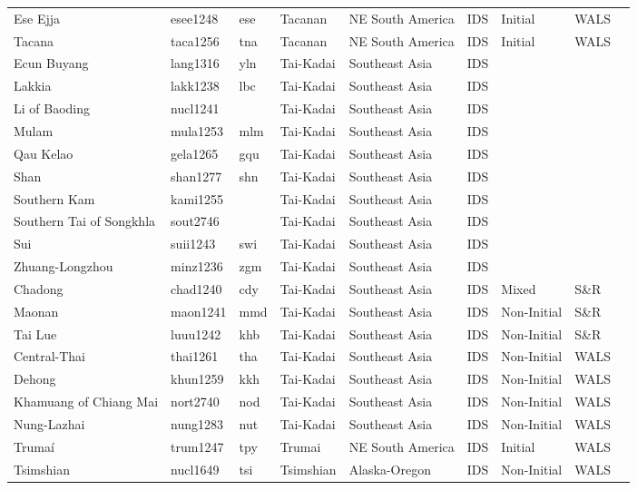 \begin{longtable}{lllllllll}
  Ese Ejja & esee1248 & ese & Tacanan & NE South America & IDS & Initial & WALS &  \\ 
  Tacana & taca1256 & tna & Tacanan & NE South America & IDS & Initial & WALS &  \\ 
  Ecun Buyang & lang1316 & yln & Tai-Kadai & Southeast Asia & IDS &  &  &  \\ 
  Lakkia & lakk1238 & lbc & Tai-Kadai & Southeast Asia & IDS &  &  &  \\ 
  Li of Baoding & nucl1241 &  & Tai-Kadai & Southeast Asia & IDS &  &  &  \\ 
  Mulam & mula1253 & mlm & Tai-Kadai & Southeast Asia & IDS &  &  &  \\ 
  Qau Kelao & gela1265 & gqu & Tai-Kadai & Southeast Asia & IDS &  &  &  \\ 
  Shan & shan1277 & shn & Tai-Kadai & Southeast Asia & IDS &  &  &  \\ 
  Southern Kam & kami1255 &  & Tai-Kadai & Southeast Asia & IDS &  &  &  \\ 
  Southern Tai of Songkhla & sout2746 &  & Tai-Kadai & Southeast Asia & IDS &  &  &  \\ 
  Sui & suii1243 & swi & Tai-Kadai & Southeast Asia & IDS &  &  &  \\ 
  Zhuang-Longzhou & minz1236 & zgm & Tai-Kadai & Southeast Asia & IDS &  &  &  \\ 
  Chadong & chad1240 & cdy & Tai-Kadai & Southeast Asia & IDS & Mixed & S\&R & \cite[604]{li_chadong2008_o} \\ 
  Maonan & maon1241 & mmd & Tai-Kadai & Southeast Asia & IDS & Non-Initial & S\&R & \cite[178]{lu_maonan2008} \\ 
  Tai Lue & luuu1242 & khb & Tai-Kadai & Southeast Asia & IDS & Non-Initial & S\&R & \cite[48]{hartmann_tai-lue1984.pdf} \\ 
  Central-Thai & thai1261 & tha & Tai-Kadai & Southeast Asia & IDS & Non-Initial & WALS &  \\ 
  Dehong & khun1259 & kkh & Tai-Kadai & Southeast Asia & IDS & Non-Initial & WALS &  \\ 
  Khamuang of Chiang Mai & nort2740 & nod & Tai-Kadai & Southeast Asia & IDS & Non-Initial & WALS &  \\ 
  Nung-Lazhai & nung1283 & nut & Tai-Kadai & Southeast Asia & IDS & Non-Initial & WALS &  \\ 
  Trumaí & trum1247 & tpy & Trumai & NE South America & IDS & Initial & WALS &  \\ 
  Tsimshian & nucl1649 & tsi & Tsimshian & Alaska-Oregon & IDS & Non-Initial & WALS &  \\ 

\end{longtable}
